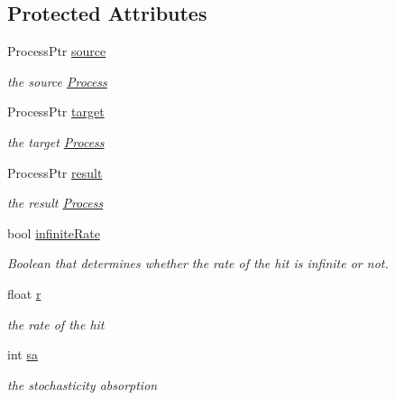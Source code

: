 \subsection*{Protected Attributes}
\begin{DoxyCompactItemize}
\item 
\hypertarget{classAction_a3c09a49605fcc2f51ee6eb792f7bb9b4}{Process\+Ptr \hyperlink{classAction_a3c09a49605fcc2f51ee6eb792f7bb9b4}{source}}\label{classAction_a3c09a49605fcc2f51ee6eb792f7bb9b4}

\begin{DoxyCompactList}\small\item\em the source \hyperlink{classProcess}{Process} \end{DoxyCompactList}\item 
\hypertarget{classAction_ac77168b4d172cfc7238cfbb422fa4a98}{Process\+Ptr \hyperlink{classAction_ac77168b4d172cfc7238cfbb422fa4a98}{target}}\label{classAction_ac77168b4d172cfc7238cfbb422fa4a98}

\begin{DoxyCompactList}\small\item\em the target \hyperlink{classProcess}{Process} \end{DoxyCompactList}\item 
\hypertarget{classAction_a5896c6900916d296ed4220063f24b78d}{Process\+Ptr \hyperlink{classAction_a5896c6900916d296ed4220063f24b78d}{result}}\label{classAction_a5896c6900916d296ed4220063f24b78d}

\begin{DoxyCompactList}\small\item\em the result \hyperlink{classProcess}{Process} \end{DoxyCompactList}\item 
\hypertarget{classAction_a5107742916f82d9f529f17606ad5ab74}{bool \hyperlink{classAction_a5107742916f82d9f529f17606ad5ab74}{infinite\+Rate}}\label{classAction_a5107742916f82d9f529f17606ad5ab74}

\begin{DoxyCompactList}\small\item\em Boolean that determines whether the rate of the hit is infinite or not. \end{DoxyCompactList}\item 
\hypertarget{classAction_a87bdc737d9edb523ec57adb27adec6b6}{float \hyperlink{classAction_a87bdc737d9edb523ec57adb27adec6b6}{r}}\label{classAction_a87bdc737d9edb523ec57adb27adec6b6}

\begin{DoxyCompactList}\small\item\em the rate of the hit \end{DoxyCompactList}\item 
\hypertarget{classAction_a5832a567f356f72e4767d84ad6a6212a}{int \hyperlink{classAction_a5832a567f356f72e4767d84ad6a6212a}{sa}}\label{classAction_a5832a567f356f72e4767d84ad6a6212a}

\begin{DoxyCompactList}\small\item\em the stochasticity absorption \end{DoxyCompactList}\end{DoxyCompactItemize}



